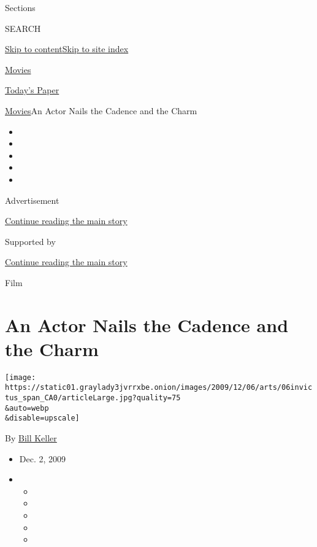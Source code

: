 Sections

SEARCH

\protect\hyperlink{site-content}{Skip to
content}\protect\hyperlink{site-index}{Skip to site index}

\href{https://www.nytimes3xbfgragh.onion/section/movies}{Movies}

\href{https://myaccount.nytimes3xbfgragh.onion/auth/login?response_type=cookie\&client_id=vi}{}

\href{https://www.nytimes3xbfgragh.onion/section/todayspaper}{Today's
Paper}

\href{/section/movies}{Movies}\textbar{}An Actor Nails the Cadence and
the Charm

\begin{itemize}
\item
\item
\item
\item
\item
\end{itemize}

Advertisement

\protect\hyperlink{after-top}{Continue reading the main story}

Supported by

\protect\hyperlink{after-sponsor}{Continue reading the main story}

Film

\hypertarget{an-actor-nails-the-cadence-and-the-charm}{%
\section{An Actor Nails the Cadence and the
Charm}\label{an-actor-nails-the-cadence-and-the-charm}}

\texttt{[image: https://static01.graylady3jvrrxbe.onion/images/2009/12/06/arts/06invictus\_span\_CA0/articleLarge.jpg?quality=75\\\&auto=webp\\\&disable=upscale]}

By
\href{https://topics.nytimes3xbfgragh.onion/top/reference/timestopics/people/k/bill_keller/index.html}{Bill
Keller}

\begin{itemize}
\item
  Dec. 2, 2009
\item
  \begin{itemize}
  \item
  \item
  \item
  \item
  \item
  \end{itemize}
\end{itemize}

